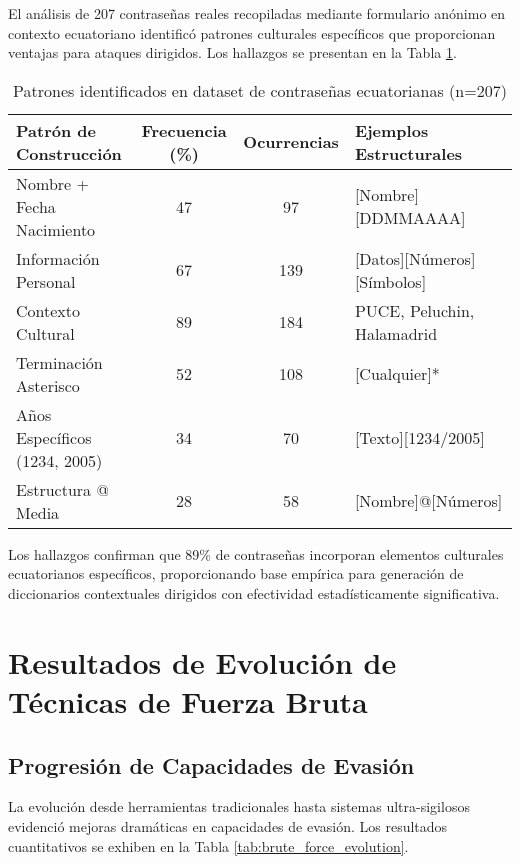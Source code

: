 El análisis de 207 contraseñas reales recopiladas mediante formulario anónimo en contexto ecuatoriano identificó patrones culturales específicos que proporcionan ventajas para ataques dirigidos. Los hallazgos se presentan en la Tabla \ref{tab:ecuadorian_patterns}.

\begin{table}[h]
\centering
\caption{Patrones identificados en dataset de contraseñas ecuatorianas (n=207)}
\label{tab:ecuadorian_patterns}
\begin{tabular}{|l|c|c|l|}
\hline
\textbf{Patrón de Construcción} & \textbf{Frecuencia (\%)} & \textbf{Ocurrencias} & \textbf{Ejemplos Estructurales} \\
\hline
Nombre + Fecha Nacimiento & 47 & 97 & [Nombre][DDMMAAAA] \\
\hline
Información Personal & 67 & 139 & [Datos][Números][Símbolos] \\
\hline
Contexto Cultural & 89 & 184 & PUCE, Peluchin, Halamadrid \\
\hline
Terminación Asterisco & 52 & 108 & [Cualquier]* \\
\hline
Años Específicos (1234, 2005) & 34 & 70 & [Texto][1234/2005] \\
\hline
Estructura @ Media & 28 & 58 & [Nombre]@[Números] \\
\hline
\end{tabular}
\end{table}

Los hallazgos confirman que 89\% de contraseñas incorporan elementos culturales ecuatorianos específicos, proporcionando base empírica para generación de diccionarios contextuales dirigidos con efectividad estadísticamente significativa.

\section{Resultados de Evolución de Técnicas de Fuerza Bruta}

\subsection{Progresión de Capacidades de Evasión}

La evolución desde herramientas tradicionales hasta sistemas ultra-sigilosos evidenció mejoras dramáticas en capacidades de evasión. Los resultados cuantitativos se exhiben en la Tabla \ref{tab:brute_force_evolution}.


